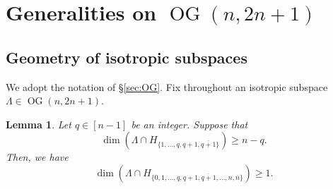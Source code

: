 \documentclass[12pt]{amsart}
\newtheorem{lemma}[definition]{Lemma}
\DeclareMathOperator{\OG}{OG}
\begin{document}
\appendix

\section{Generalities on $\OG(n,2n+1)$}

\subsection{Geometry of isotropic subspaces}

We adopt the notation of \S\ref{sec:OG}. Fix throughout an isotropic subspace $\Lambda\in\OG(n,2n+1)$. 

\begin{lemma}\label{find_nice_vector}
Let $q\in[n-1]$ be an integer. Suppose that
\begin{equation*}
    \dim(\Lambda\cap H_{\{1,\ldots,q,q+1,\overline{q+1}\}})\ge n-q.
\end{equation*}
Then, we have 
\begin{equation*}
\dim(\Lambda\cap H_{\{0,1,\ldots,q,q+1,\overline{q+1},\ldots,n,\overline{n}\}})\ge 1.
    \end{equation*}
\end{lemma}
\end{document}
